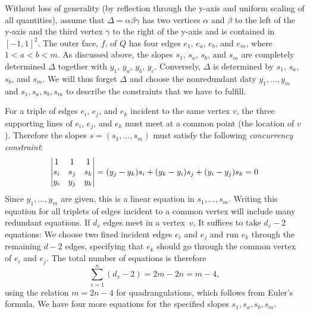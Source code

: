 \documentclass{patmorin}
\begin{document}
Without loss of generality (by reflection through the y-axis and uniform
scaling of all quantities), assume that $\Delta=\alpha\beta\gamma$
has two vertices $\alpha$ and $\beta$ to the left of the y-axis and
the third vertex $\gamma$ to the right of the y-axis and is contained
in $[-1,1]^2$.  The outer face, $f$, of $Q$ has four edges $e_1$, $e_a$,
$e_b$, and $e_m$, where $1 < a < b < m$.  As discussed above, the slopes
$s_1$, $s_a$, $s_b$, and $s_m$ are completely determined $\Delta$
together with $y_1$, $y_a$,
$y_b$, $y_c$.
Conversely, $\Delta$ is determined by
$s_1$, $s_a$, $s_b$, and $s_m$. We will thus forget $\Delta$ and
choose the nonredundant daty
$y_1,\ldots,y_m$ and
$s_1, s_a, s_b, s_m$
to describe the constraints that we have to fulfill.

For a triple of edges $e_i$, $e_j$, and $e_k$ incident to the same
vertex $v$, the three supporting lines of $e_i$, $e_j$, and $e_k$ must
meet at a common point (the location of $v$). Therefore
the slopes %
$s=(s_1,\ldots,s_m)$ must satisfy the following \emph{concurrency constraint}:
\begin{equation}\eqlabel{slope} 
\left|
  \begin{matrix}
    1&1&1\\
s_i&s_j&s_k\\
y_i&y_j&y_k
  \end{matrix}
\right|=
   ({y_j-y_k}) s_i + ({y_k-y_i}) s_j 
          + ({y_i-y_j})s_k  = 0
\end{equation}
Since $y_1,\ldots,y_m$ are given, this is a linear equation
in $s_1,\ldots,s_m$.
Writing this equation for all triplets of edges incident to a common
vertex will include many redundant equations.
If $d_v$ edges meet in a vertex~$v$, 
 It suffices to take $d_v-2$ equations: We choose two fixed
incident edges $e_i$ and $e_j$ and run $e_k$ through the remaining
$d-2$ edges, specifying that $e_k$ should go through the common vertex
of $e_i$ and $e_j$.  The total number of equations is therefore
\begin{equation}
  \label{eq:number-equations}
  \sum_{v=1}^n(d_v-2) = 2m-2n = m-4,
\end{equation}
using the relation $m=2n-4$ for quadrangulations, which follows from
Euler's formula.
 We have four more equations for the specified slopes
$s_1, s_a, s_b, s_m$.
%
\end{document}
